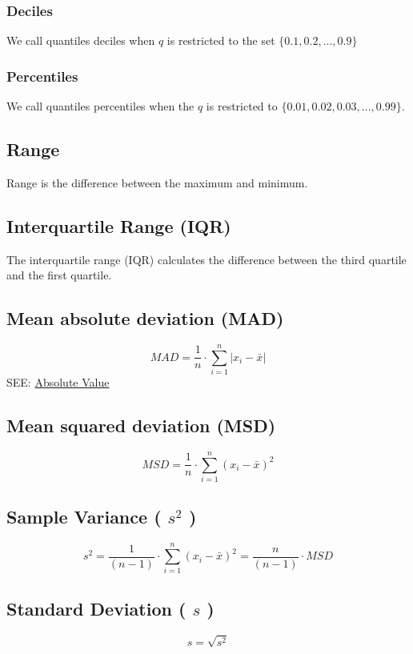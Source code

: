 \subsubsection{Deciles \cite{ism-1}}\label{Deciles}
We call quantiles deciles when $q$ is restricted to the set $\{0.1, 0.2, ... , 0.9\}$

\subsubsection{Percentiles \cite{ism-1}}\label{Percentiles}
We call quantiles percentiles when the $q$ is restricted to $\{0.01, 0.02, 0.03, ... , 0.99\}$.

\subsection{Range \cite{ism-1}}\label{Range}
Range is the difference between the maximum and minimum.

\subsection{Interquartile Range (IQR) \cite{ism-1}}\label{Interquartile Range (IQR)}
The interquartile range (IQR) calculates the difference between the third quartile and the first quartile.

\subsection{Mean absolute deviation (MAD) \cite{ism-1}}\label{Mean absolute deviation}
\[
    MAD = \displaystyle\dfrac{1}{n} \cdot \sum_{i=1}^{n} \left| x_i - \bar{x} \right|
\]
SEE: \hyperref[abs_value]{Absolute Value}


\subsection{Mean squared deviation (MSD) \cite{ism-1}} \label{Mean squared deviation}
\[
    MSD = \displaystyle\dfrac{1}{n} \cdot \sum_{i=1}^{n} ( x_i - \bar{x} )^2
\]


\subsection{Sample Variance ( $s^2$ ) \cite{ism-1}}\label{Sample Variance}
\[
    s^2 = \displaystyle\dfrac{1}{(n-1)} \cdot \sum_{i=1}^{n} ( x_i - \bar{x} )^2 = \displaystyle\dfrac{n}{(n-1)} \cdot MSD
\]

\subsection{Standard Deviation ( $s$ ) \cite{ism-1}}\label{Standard Deviation}
\[
    s = \sqrt{s^2}
\]

